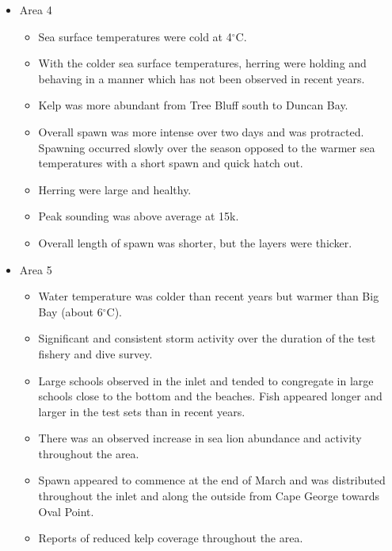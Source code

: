 \begin{itemize}

\item{Area 4}

\begin{itemize}

\item Sea surface temperatures were cold at 4$^\circ\text{C}$.

\item With the colder sea surface temperatures, herring were holding and
behaving in a manner which has not been observed in recent years.

\item Kelp was more abundant from Tree Bluff south to Duncan Bay. 

\item Overall spawn was more intense over two days and was protracted.
Spawning occurred slowly over the season opposed to the warmer sea temperatures with a short spawn and quick hatch out.

\item Herring were large and healthy.

\item Peak sounding was above average at 15k.

\item Overall length of spawn was shorter, but the layers were thicker.

\end{itemize}

\item{Area 5}

\begin{itemize}

\item Water temperature was colder than recent years but warmer than Big Bay (about 6$^\circ\text{C}$).

\item Significant and consistent storm activity over the duration of the test fishery and dive survey.

\item Large schools observed in the inlet and tended to congregate in large schools
close to the bottom and the beaches.
Fish appeared longer and larger in the test sets than in recent years.

\item There was an observed increase in sea lion abundance and activity throughout the area.

\item Spawn appeared to commence at the end of March and was distributed
throughout the inlet and along the outside from Cape George towards Oval Point.

\item Reports of reduced kelp coverage throughout the area.

\end{itemize}

\end{itemize}